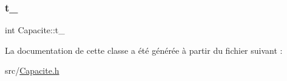 \mbox{\label{class_capacite_ac743cb7c9605c9e3205885cdcf14d2dd}} 
\subsubsection{\texorpdfstring{t\+\_\+}{t\_}}
{\footnotesize\ttfamily int Capacite\+::t\+\_\+\hspace{0.3cm}{\ttfamily [protected]}}



La documentation de cette classe a été générée à partir du fichier suivant \+:\begin{DoxyCompactItemize}
\item 
src/\hyperlink{_capacite_8h}{Capacite.\+h}\end{DoxyCompactItemize}
